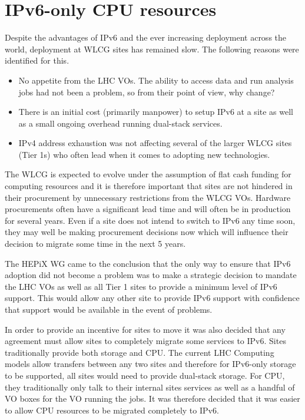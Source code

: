 \documentclass[a4paper]{jpconf}
\begin{document}
\section{IPv6-only CPU resources}
Despite the advantages of IPv6 and the ever increasing deployment
across the world, deployment at WLCG sites has remained slow.  The
following reasons were identified for this.
\begin{itemize}
\item No appetite from the LHC VOs.  The ability to access data and
  run analysis jobs had not been a problem, so from their point of
  view, why change?
\item There is an initial cost (primarily manpower) to setup IPv6 at a
  site as well as a small ongoing overhead running dual-stack
  services.
\item IPv4 address exhaustion was not affecting several of the larger
  WLCG sites (Tier 1s) who often lead when it comes to adopting new
  technologies.
\end{itemize}

The WLCG is expected to evolve under the assumption of flat cash
funding for computing resources and it is therefore important that
sites are not hindered in their procurement by unnecessary
restrictions from the WLCG VOs. Hardware procurements often have a
significant lead time and will often be in production for several
years.  Even if a site does not intend to switch to IPv6 any time
soon, they may well be making procurement decisions now which will
influence their decision to migrate some time in the next 5 years.

The HEPiX WG came to the conclusion that the only way to ensure that
IPv6 adoption did not become a problem was to make a strategic
decision to mandate the LHC VOs as well as all Tier 1 sites to provide
a minimum level of IPv6 support.  This would allow any other site to
provide IPv6 support with confidence that support would be available
in the event of problems.

In order to provide an incentive for sites to move it was also decided
that any agreement must allow sites to completely migrate some
services to IPv6. Sites traditionally provide both storage and CPU.
The current LHC Computing models allow transfers between any two sites
and therefore for IPv6-only storage to be supported, all sites would
need to provide dual-stack storage.  For CPU, they traditionally only
talk to their internal sites services as well as a handful of VO boxes
for the VO running the jobs.  It was therefore decided that it was
easier to allow CPU resources to be migrated completely to IPv6.
\end{document}
